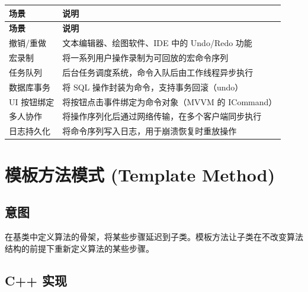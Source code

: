 \documentclass[12pt,a4paper,fontset=fandol]{ctexbook}
\begin{document}
\begin{longtable}{p{4.5cm} p{8.5cm}}
\toprule
\textbf{场景} & \textbf{说明} \\
\midrule
\endfirsthead
\toprule
\textbf{场景} & \textbf{说明} \\
\midrule
\endhead
\bottomrule
\endfoot
撤销/重做 & 文本编辑器、绘图软件、IDE 中的 Undo/Redo 功能 \\
宏录制 & 将一系列用户操作录制为可回放的宏命令序列 \\
任务队列 & 后台任务调度系统，命令入队后由工作线程异步执行 \\
数据库事务 & 将 SQL 操作封装为命令，支持事务回滚（undo） \\
UI 按钮绑定 & 将按钮点击事件绑定为命令对象（MVVM 的 ICommand） \\
多人协作 & 将操作序列化后通过网络传输，在多个客户端同步执行 \\
日志持久化 & 将命令序列写入日志，用于崩溃恢复时重放操作 \\
\end{longtable}

\chapter{模板方法模式 (Template Method)}

\section{意图}

在基类中定义算法的骨架，将某些步骤延迟到子类。模板方法让子类在不改变算法结构的前提下重新定义算法的某些步骤。

\section{C++ 实现}
\end{document}
